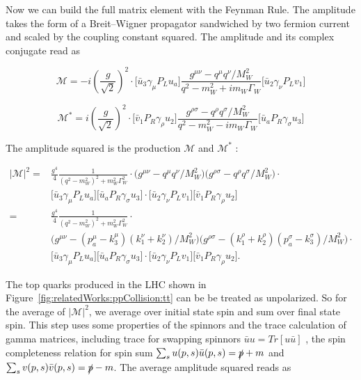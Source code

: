 \noindent Now we can build the full matrix element with the Feynman Rule. The amplitude takes the form of a Breit–Wigner propagator sandwiched by two fermion current and scaled by the coupling constant squared. The amplitude and its  complex conjugate read as

\begin{equation}
	\mathcal{M}  =  -i (\frac{g }{\sqrt{2}})^2 \cdot 
	\big[ \bar{u}_3 \gamma_\mu P_L u_a \big] 
	\frac{g^{\mu \nu} - q^\mu q^\nu/M^2_{W}}{q^2-m^2_{W} + i m_W \Gamma_W} 
	\big[ \bar{u}_2 \gamma_\nu P_L v_1 \big] 
    \label{eqn:relatedWorks:bsm:smTopDecay:smTopDecay:m}
\end{equation}


\begin{equation}
	\mathcal{M}^*  =  i (\frac{g }{\sqrt{2}})^2 \cdot 
	\big[ \bar{v}_1 P_R \gamma_\rho  u_2 \big] 
	\frac{g^{\rho \sigma} - q^\rho q^\sigma /M^2_{W}}{q^2-m^2_{W} - i m_W \Gamma_W} 
	\big[ \bar{u}_a P_R \gamma_\sigma  u_3 \big] 
\end{equation}

\noindent The amplitude squared is the production $\mathcal{M}$  and $\mathcal{M^*} $ :

\begin{equation}
\begin{split}
	|\mathcal{M}|^2  = &  \frac{g^4}{4} \frac{1}{ (q^2-m^2_{W})^2 +  m^2_W \Gamma^2_W } \cdot \big (g^{\mu \nu} - q^\mu q^\nu/M^2_{W} \big) \big(g^{\rho \sigma} - q^\rho q^\sigma / M^2_{W}\big)  \cdot  \\
    &\big[ \bar{u}_3 \gamma_\mu P_L u_a \big]  \big[ \bar{u}_a P_R \gamma_\sigma  u_3 \big] \cdot \big[ \bar{u}_2 \gamma_\nu P_L v_1 \big]  \big[ \bar{v}_1 P_R \gamma_\rho  u_2 \big] \\
    = & \frac{g^4}{4} \frac{1}{ (q^2-m^2_{W})^2 +  m^2_W \Gamma^2_W } \cdot \\
    & \big (g^{\mu \nu} - (p_a^\mu-k_3^\mu) (k_1^\nu+k_2^\nu) /M^2_{W} \big) \big(g^{\rho \sigma} - (k_1^\rho+k_2^\rho) (p_a^\sigma -k_3^\sigma )/ M^2_{W}\big)  \cdot \\
    & \big[ \bar{u}_3 \gamma_\mu P_L u_a \big]  \big[ \bar{u}_a P_R \gamma_\sigma  u_3 \big] \cdot \big[ \bar{u}_2 \gamma_\nu P_L v_1 \big]  \big[ \bar{v}_1 P_R \gamma_\rho  u_2 \big] .
\end{split}
\end{equation}

\noindent The top quarks produced in the LHC shown in Figure~\ref{fig:relatedWorks:ppCollision:tt} can be be treated as unpolarized. So for the average of $|\mathcal{M}|^2$, we average over initial state spin and sum over final state spin. This step uses some properties of the spinnors and the trace calculation of gamma matrices, including trace for swapping spinnors $\bar{u} u = Tr[ u \bar{u}] $ , the spin completeness relation for spin sum $\sum_s u(p,s) \bar{u}(p,s) = \slashed{p} + m $  and $\sum_s v(p,s) \bar{v}(p,s) = \slashed{p} - m$. The average amplitude squared reads as

